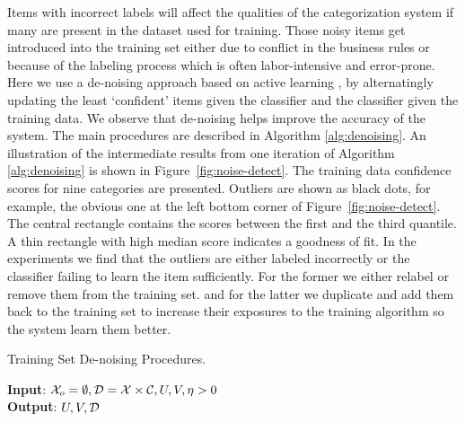 Items with incorrect labels will affect the qualities of the categorization system if many are present in the dataset used for training. Those noisy items get introduced into the training set either due to conflict in the business rules or because of the labeling process which is often labor-intensive and error-prone. Here we use a de-noising approach based on active learning \cite{culotta2005reducing}, by alternatingly updating the least `confident' items given the classifier and the classifier given the training data. We observe that de-noising helps improve the accuracy of the system.
The main procedures are described in Algorithm \ref{alg:denoising}. 
An illustration of the intermediate results from one iteration of Algorithm \ref{alg:denoising} is shown in Figure~\ref{fig:noise-detect}. The training data confidence scores for nine categories are presented. 
Outliers are shown as black dots, for example, the obvious one at the left bottom corner of Figure~\ref{fig:noise-detect}. The central rectangle contains the scores between the first and the third quantile. A thin rectangle with high median score indicates a goodness of fit.
In the experiments we find that the outliers are either labeled incorrectly or the classifier failing to learn the item sufficiently. For the former we either relabel or remove them from the training set. and for the latter we duplicate and add them back to the training set to increase their exposures to the training algorithm so the system learn them better. 


\begin{algorithm2e}[htb]
\caption{Training Set De-noising Procedures.}
\label{alg:denoising}
  \textbf{Input}: $\mathcal{X}_o = \emptyset, \mathcal{D} = \mathcal{X} \times \mathcal{C}, U, V, \eta > 0$ \\ 
  \textbf{Output}: $U, V, \mathcal{D}$
\end{algorithm2e}

